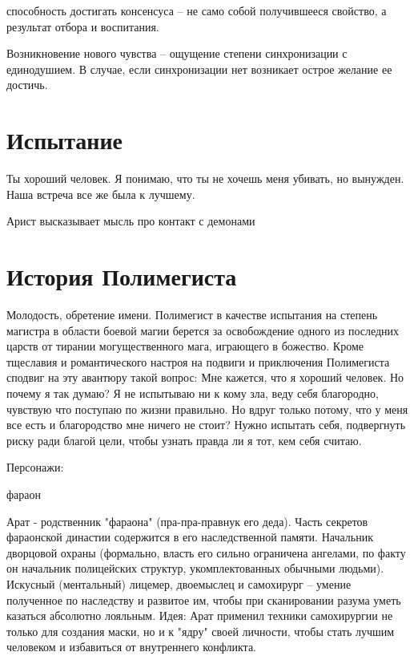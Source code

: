 \documentclass[12pt,a4paper]{article}
\begin{document}
способность достигать консенсуса -- не само собой получившееся свойство, а результат отбора и воспитания.

Возникновение нового чувства -- ощущение степени синхронизации с единодушием. В случае, если синхронизации нет возникает острое желание ее достичь.

\section*{Испытание}

Ты хороший человек. Я понимаю, что ты не хочешь меня убивать, но вынужден. Наша встреча все же была к лучшему.

Арист высказывает мысль про контакт с демонами


\section*{История Полимегиста}

Молодость, обретение имени. 
Полимегист в качестве испытания на степень магистра в области боевой магии берется за освобождение одного из последних царств от тирании могущественного мага, играющего в божество.
Кроме тщеславия и романтического настроя на подвиги и приключения Полимегиста сподвиг на эту авантюру такой вопрос: Мне кажется, что я хороший человек. Но почему я так думаю? Я не испытываю ни к кому зла, веду себя благородно, чувствую что поступаю по жизни правильно. Но вдруг только потому, что у меня все есть и благородство мне ничего не стоит? Нужно испытать себя, подвергнуть риску ради благой цели, чтобы узнать правда ли я тот, кем себя считаю.

Персонажи:

фараон

Арат - родственник "фараона" (пра-пра-правнук его деда). Часть секретов фараонской династии содержится в его наследственной памяти. Начальник дворцовой охраны (формально, власть его сильно ограничена ангелами, по факту он начальник полицейских структур, укомплектованных обычными людьми). Искусный (ментальный) лицемер, двоемыслец и самохирург -- умение полученное по наследству и развитое им, чтобы при сканировании разума уметь казаться абсолютно лояльным. Идея: Арат применил техники самохирургии не только для создания маски, но и к "ядру" своей личности, чтобы стать лучшим человеком и избавиться от внутреннего конфликта.
\end{document}
